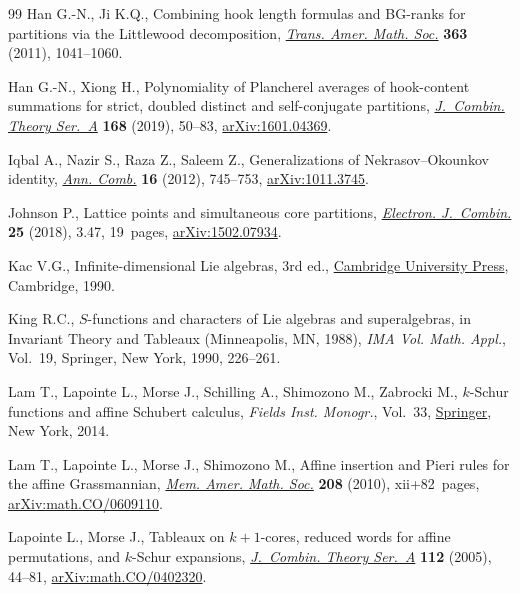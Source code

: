 \documentclass[10pt,a4paper]{amsart}
\numberwithin{equation}{section}
\begin{document}
\begin{thebibliography}{99}
Han G.-N., Ji K.Q., Combining hook length formulas and {BG}-ranks for partitions
 via the {L}ittlewood decomposition, \href{https://doi.org/10.1090/S0002-9947-2010-05191-8}{\textit{Trans. Amer. Math. Soc.}}
 \textbf{363} (2011), 1041--1060.

Han G.-N., Xiong H., Polynomiality of {P}lancherel averages of hook-content
 summations for strict, doubled distinct and self-conjugate partitions,
 \href{https://doi.org/10.1016/j.jcta.2019.05.012}{\textit{J.~Combin. Theory Ser.~A}} \textbf{168} (2019), 50--83,
 \href{https://arxiv.org/abs/1601.04369}{arXiv:1601.04369}.

Iqbal A., Nazir S., Raza Z., Saleem Z., Generalizations of
 {N}ekrasov--{O}kounkov identity, \href{https://doi.org/10.1007/s00026-012-0157-2}{\textit{Ann. Comb.}} \textbf{16} (2012),
 745--753, \href{https://arxiv.org/abs/1011.3745}{arXiv:1011.3745}.

Johnson P., Lattice points and simultaneous core partitions, \href{https://doi.org/10.37236/5734}{\textit{Electron.
 J.~Combin.}} \textbf{25} (2018), 3.47, 19~pages, \href{https://arxiv.org/abs/1502.07934}{arXiv:1502.07934}.

Kac V.G., Infinite-dimensional {L}ie algebras, 3rd ed., \href{https://doi.org/10.1017/CBO9780511626234}{Cambridge University
 Press}, Cambridge, 1990.

King R.C., {$S$}-functions and characters of {L}ie algebras and superalgebras,
 in Invariant Theory and Tableaux ({M}inneapolis, {MN}, 1988), \textit{IMA
 Vol. Math. Appl.}, Vol.~19, Springer, New York, 1990, 226--261.

Lam T., Lapointe L., Morse J., Schilling A., Shimozono M., Zabrocki M.,
 {$k$}-{S}chur functions and affine {S}chubert calculus, \textit{Fields Inst.
 Monogr.}, Vol.~33, \href{https://doi.org/10.1007/978-1-4939-0682-6}{Springer}, New York, 2014.

Lam T., Lapointe L., Morse J., Shimozono M., Affine insertion and {P}ieri rules
 for the affine {G}rassmannian, \href{https://doi.org/10.1090/S0065-9266-10-00576-4}{\textit{Mem. Amer. Math. Soc.}} \textbf{208}
 (2010), xii+82~pages, \href{https://arxiv.org/abs/math.CO/0609110}{arXiv:math.CO/0609110}.

Lapointe L., Morse J., Tableaux on {$k+1$}-cores, reduced words for affine
 permutations, and {$k$}-{S}chur expansions, \href{https://doi.org/10.1016/j.jcta.2005.01.003}{\textit{J.~Combin. Theory Ser.~A}}
 \textbf{112} (2005), 44--81, \href{https://arxiv.org/abs/math.CO/0402320}{arXiv:math.CO/0402320}.


\end{thebibliography}
\end{document}
